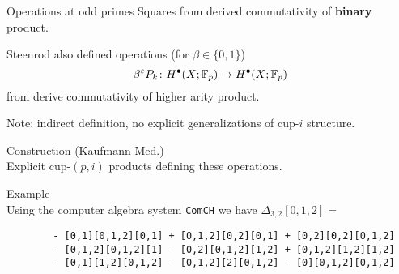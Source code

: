 
%
%
%

\begin{frame}[fragile]{Operations at odd primes}
	\pause
	Squares from derived commutativity of \textbf{binary} product.

	\medskip\pause
	Steenrod also defined operations (for $\beta \in \{0,1\}$)
	\[
	\beta^{\varepsilon} P_k \colon H^\bullet(X; {\mathbb{F}_p}) \to H^\bullet(X; {\mathbb{F}_p})
	\]
	from derive commutativity of higher arity product.

	\medskip\pause
	\textcolor{pblue}{Note}: indirect definition, no explicit generalizations of cup-$i$ structure.

	\medskip\pause
	\textcolor{pblue}{Construction (Kaufmann-Med.)} \\
	Explicit cup-$(p,i)$ products defining these operations.

	\medskip\pause
	\textcolor{pblue}{Example} \\
	Using the computer algebra system \textcolor{pblue}{\texttt{ComCH}} we have $\Delta_{3,2}[0,1,2] = $

	\begin{verbatim}
		- [0,1][0,1,2][0,1] + [0,1,2][0,2][0,1] + [0,2][0,2][0,1,2]
		- [0,1,2][0,1,2][1] - [0,2][0,1,2][1,2] + [0,1,2][1,2][1,2]
		- [0,1][1,2][0,1,2] - [0,1,2][2][0,1,2] - [0][0,1,2][0,1,2]
	\end{verbatim}
\end{frame}

